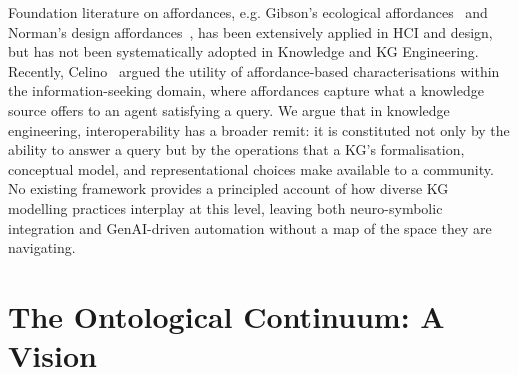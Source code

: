 \documentclass[runningheads]{llncs}
\newenvironment{onlyshort}{\ignorespaces}{\ignorespacesafterend}
\newenvironment{inboth}{}{}
\newcommand{\ppinfo}[1]{{ \normalfont\color{red}\small(#1 pp)}}
\renewcommand{\ppinfo}[1]{} %
\begin{document}
\begin{inboth}\begin{sloppypar}
Foundation literature on affordances, e.g. Gibson's ecological 
affordances~\cite{gibson1977theory} and Norman's design 
affordances~\cite{norman1999affordance}, has been extensively 
applied in HCI and design, but has not been systematically adopted 
in Knowledge and KG Engineering. Recently, Celino~\cite{celino2026ka} 
argued the utility of affordance-based characterisations within the 
information-seeking domain, where affordances capture what a knowledge 
source offers to an agent satisfying a query. We argue that in knowledge engineering, 
interoperability has a broader remit: it is constituted not only by the 
ability to answer a query but by the operations that a KG's 
formalisation, conceptual model, and representational choices make 
available to a community. No existing framework provides a principled account of how diverse KG modelling practices interplay at 
this level, leaving both neuro-symbolic integration and GenAI-driven 
automation without a map of the space they are navigating.
\end{sloppypar}
\end{inboth}


\section{The Ontological Continuum: A Vision\ppinfo{ends at p5: 1.5}}\begin{onlyshort}\vspace{-0.2cm}\end{onlyshort}
\end{document}
